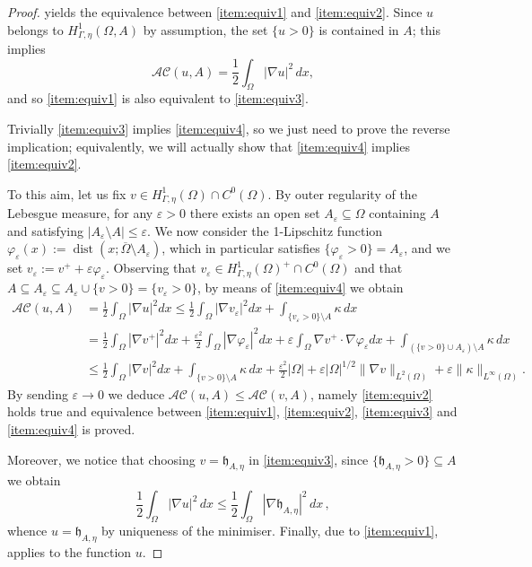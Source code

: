 \documentclass[10pt,a4paper]{amsart}
\begin{document}
\begin{proof} 
     yields the equivalence between \eqref{item:equiv1} and \eqref{item:equiv2}. Since $u$ belongs to $H^1_{\Gamma,\eta}(\Omega,A)$ by assumption, the set $\{u>0\}$ is contained in $A$; this implies
    \begin{equation}
       \mathcal{AC}(u,A)=\frac 12 \int_\Omega |\nabla u|^2 \, dx, 
    \end{equation}
    and so \eqref{item:equiv1} is also equivalent to \eqref{item:equiv3}.

    Trivially \eqref{item:equiv3} implies \eqref{item:equiv4}, so we just need to prove the reverse implication; equivalently, we will actually show that \eqref{item:equiv4} implies \eqref{item:equiv2}.

    To this aim, let us fix $v\in  H^1_{\Gamma,\eta}(\Omega)\cap C^0(\Omega)$. By outer regularity of the Lebesgue measure, for any $\varepsilon >0$ there exists an open set $A_\varepsilon\subseteq \Omega$ containing $A$ and satisfying $|A_\varepsilon\setminus A|\le \varepsilon$. We now consider the 1-Lipschitz function $\varphi_\varepsilon(x):=\operatorname{dist}(x;\overline{\Omega}\setminus A_\varepsilon)$, which in particular satisfies $\{\varphi_\varepsilon>0\}=A_\varepsilon$, and we set $v_\varepsilon:=v^++\varepsilon\varphi_\varepsilon $. Observing that $v_\varepsilon\in H^1_{\Gamma,\eta}(\Omega)^+\cap C^0(\Omega)$ and that $A\subseteq A_\varepsilon\subseteq A_\varepsilon\cup \{v>0\}=\{v_\varepsilon>0\}$, by means of \eqref{item:equiv4} we obtain
    \begin{align}
        \mathcal{AC}(u,A)&=\frac 12 \int_\Omega |\nabla u|^2 dx\le \frac 12 \int_\Omega |\nabla v_\varepsilon|^2 dx+\int_{\{v_\varepsilon>0\}\setminus A}\kappa\, dx\\
        &=\frac 12 \int_\Omega |\nabla v^+|^2 dx+\frac{\varepsilon^2}{2}\int_\Omega |\nabla \varphi_\varepsilon|^2 dx+ \varepsilon\int_\Omega \nabla v^+\cdot\nabla \varphi_\varepsilon dx+ \int_{(\{v>0\}\cup A_\varepsilon)\setminus A}\kappa\, dx\\
        &\le \frac 12 \int_\Omega |\nabla v|^2 dx +\int_{\{v>0\}\setminus A}\kappa\, dx+\frac{\varepsilon^2}{2}|\Omega|+\varepsilon|\Omega|^{1/2}\|\nabla v\|_{L^2(\Omega)}+\varepsilon\|\kappa\|_{L^\infty(\Omega)}.
    \end{align}
    By sending $\varepsilon\to 0$ we deduce $\mathcal{AC}(u,A)\le \mathcal{AC}(v,A)$, namely \eqref{item:equiv2} holds true and equivalence between \eqref{item:equiv1}, \eqref{item:equiv2}, \eqref{item:equiv3} and \eqref{item:equiv4} is proved.

    Moreover, we notice that choosing $v=\mathfrak{h}_{A,\eta}$ in \eqref{item:equiv3}, since $\{\mathfrak{h}_{A,\eta}>0\}\subseteq A$ we obtain 
    \begin{equation}
        \frac 12\int_\Omega |\nabla u|^2 \, dx   \leq \frac 12 \int_\Omega |\nabla \mathfrak{h}_{A,\eta}|^2 \, dx \,,
    \end{equation}
    whence $u=\mathfrak{h}_{A,\eta}$  by uniqueness of the minimiser.
    Finally, due to \eqref{item:equiv1},  applies to the function $u$.
\end{proof}
\end{document}
